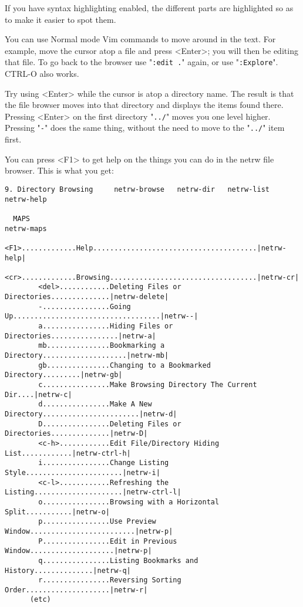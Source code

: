 If you have syntax highlighting enabled, the different parts are highlighted so as to make it easier to spot them.

You can use Normal mode Vim commands to move around in the text.
For example, move the cursor atop a file and press <Enter>; you will then be editing that file.
To go back to the browser use "\verb!:edit .!" again, or use "\verb!:Explore!".
CTRL-O also works.

Try using <Enter> while the cursor is atop a directory name.
The result is that the file browser moves into that directory and displays the items found there.
Pressing <Enter> on the first directory "\verb!../!" moves you one level higher.
Pressing "\verb!-!" does the same thing, without the need to move to the "\verb!../!" item first.

You can press <F1> to get help on the things you can do in the netrw file browser.
This is what you get:
\begin{Verbatim}[samepage=true]
  9. Directory Browsing     netrw-browse   netrw-dir   netrw-list   netrw-help 

  MAPS                                                                  netrw-maps 
        <F1>.............Help.......................................|netrw-help|
        <cr>.............Browsing...................................|netrw-cr|
        <del>............Deleting Files or Directories..............|netrw-delete|
        -................Going Up...................................|netrw--|
        a................Hiding Files or Directories................|netrw-a|
        mb...............Bookmarking a Directory....................|netrw-mb|
        gb...............Changing to a Bookmarked Directory.........|netrw-gb|
        c................Make Browsing Directory The Current Dir....|netrw-c|
        d................Make A New Directory.......................|netrw-d|
        D................Deleting Files or Directories..............|netrw-D|
        <c-h>............Edit File/Directory Hiding List............|netrw-ctrl-h|
        i................Change Listing Style.......................|netrw-i|
        <c-l>............Refreshing the Listing.....................|netrw-ctrl-l|
        o................Browsing with a Horizontal Split...........|netrw-o|
        p................Use Preview Window.........................|netrw-p|
        P................Edit in Previous Window....................|netrw-p|
        q................Listing Bookmarks and History..............|netrw-q|
        r................Reversing Sorting Order....................|netrw-r|
      (etc)
\end{Verbatim}

